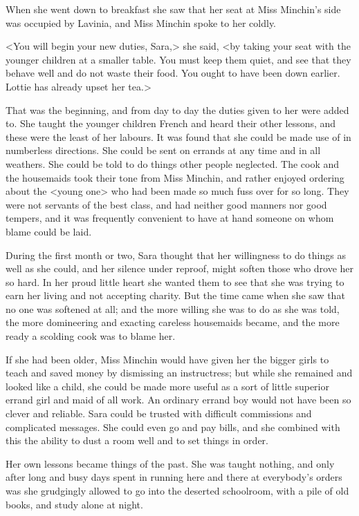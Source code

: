 When she went down to breakfast she saw that her seat at Miss Minchin's side was occupied by Lavinia, and Miss Minchin spoke to her coldly.

<You will begin your new duties, Sara,> she said, <by taking your seat with the younger children at a smaller table. You must keep them quiet, and see that they behave well and do not waste their food. You ought to have been down earlier. Lottie has already upset her tea.>

That was the beginning, and from day to day the duties given to her were added to. She taught the younger children French and heard their other lessons, and these were the least of her labours. It was found that she could be made use of in numberless directions. She could be sent on errands at any time and in all weathers. She could be told to do things other people neglected. The cook and the housemaids took their tone from Miss Minchin, and rather enjoyed ordering about the <young one> who had been made so much fuss over for so long. They were not servants of the best class, and had neither good manners nor good tempers, and it was frequently convenient to have at hand someone on whom blame could be laid.

During the first month or two, Sara thought that her willingness to do things as well as she could, and her silence under reproof, might soften those who drove her so hard. In her proud little heart she wanted them to see that she was trying to earn her living and not accepting charity. But the time came when she saw that no one was softened at all; and the more willing she was to do as she was told, the more domineering and exacting careless housemaids became, and the more ready a scolding cook was to blame her.

If she had been older, Miss Minchin would have given her the bigger girls to teach and saved money by dismissing an instructress; but while she remained and looked like a child, she could be made more useful as a sort of little superior errand girl and maid of all work. An ordinary errand boy would not have been so clever and reliable. Sara could be trusted with difficult commissions and complicated messages. She could even go and pay bills, and she combined with this the ability to dust a room well and to set things in order.

Her own lessons became things of the past. She was taught nothing, and only after long and busy days spent in running here and there at everybody's orders was she grudgingly allowed to go into the deserted schoolroom, with a pile of old books, and study alone at night.

